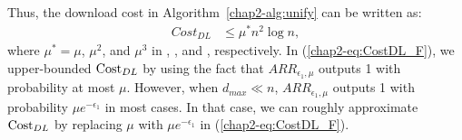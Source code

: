 Thus, 
the download cost in Algorithm~\ref{chap2-alg:unify} 
can be written as:
\begin{align}
   Cost_{DL} &\leq \mu^* n^2 \log n,  \label{chap2-eq:CostDL_F}
\end{align}
where $\mu^* = \mu$, $\mu^2$, and $\mu^3$ in \AlgOne{}, \AlgTwo{}, and \AlgThree{}, respectively. 
In (\ref{chap2-eq:CostDL_F}), 
we upper-bounded $\mathrm{Cost}_{DL}{}$ by using the fact that $ARR_{\epsilon_1,\mu}$ outputs 1 with probability at most $\mu$. 
However, when $d_{max} \ll n$, 
$ARR_{\epsilon_1,\mu}$ outputs 1 with probability $\mu e^{- \epsilon_1}$ in most cases. 
In that case, we can roughly approximate $\mathrm{Cost}_{DL}{}$ by replacing $\mu$ with $\mu e^{- \epsilon_1}$ in (\ref{chap2-eq:CostDL_F}). 

